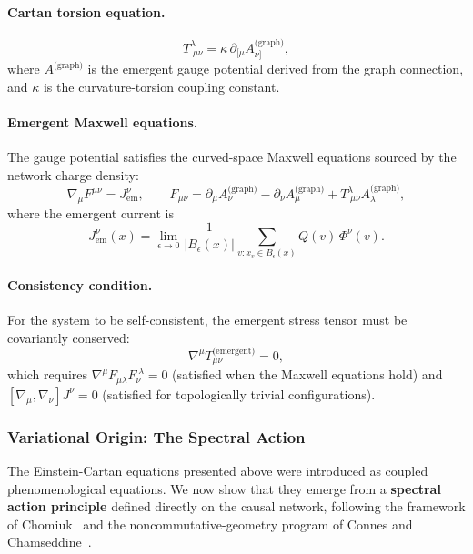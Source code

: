 \documentclass[11pt,a4paper]{article}
\theoremstyle{definition}
\theoremstyle{remark}
\newcommand{\Tem}{T^{\text{(emergent)}}}
\newcommand{\Agraph}{A^{\text{(graph)}}}
\newcommand{\Jem}{J_{\text{em}}}
\begin{document}
\paragraph{Cartan torsion equation.}
\begin{equation}\label{eq:cartan}
T^{\lambda}_{\;\mu\nu}
= \kappa \, \partial_{[\mu} A_{\nu]}^{\text{(graph)}},
\end{equation}
where $\Agraph$ is the emergent gauge potential derived from the graph
connection, and $\kappa$ is the curvature-torsion coupling constant.

\paragraph{Emergent Maxwell equations.} The gauge potential satisfies the
curved-space Maxwell equations sourced by the network charge density:
\begin{equation}
\nabla_{\mu} F^{\mu\nu} = \Jem^{\nu},
\qquad
F_{\mu\nu} = \partial_{\mu} A_{\nu}^{\text{(graph)}}
- \partial_{\nu} A_{\mu}^{\text{(graph)}}
+ T^{\lambda}_{\;\mu\nu} A_{\lambda}^{\text{(graph)}},
\end{equation}
where the emergent current is
\begin{equation}\label{eq:Jem}
\Jem^{\nu}(x) = \lim_{\epsilon \to 0}
\frac{1}{|B_{\epsilon}(x)|}
\sum_{v: x_{v} \in B_{\epsilon}(x)} Q(v) \, \Phi^{\nu}(v).
\end{equation}

\paragraph{Consistency condition.} For the system to be self-consistent, the
emergent stress tensor must be covariantly conserved:
\begin{equation}
\nabla^{\mu} \Tem_{\mu\nu} = 0,
\end{equation}
which requires $\nabla^{\mu} F_{\mu\lambda} F_{\nu}^{\;\lambda} = 0$ (satisfied
when the Maxwell equations hold) and $[\nabla_{\mu}, \nabla_{\nu}] J^{\nu} = 0$
(satisfied for topologically trivial configurations).

\subsubsection{Variational Origin: The Spectral Action}\label{subsubsec:spectral-action}

The Einstein-Cartan equations presented above were introduced as coupled
phenomenological equations. We now show that they emerge from a \textbf{spectral
action principle} defined directly on the causal network, following the
framework of Chomiuk~\cite{Chomiuk2026} and the noncommutative-geometry program
of Connes and Chamseddine~\cite{Connes1996,Chamseddine1997}.
\end{document}
